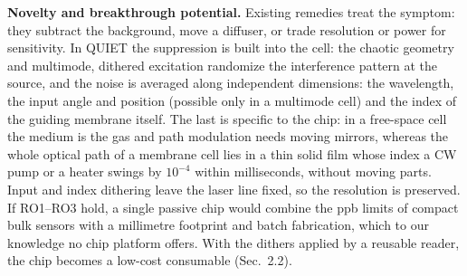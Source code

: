 \documentclass[a4paper,12pt]{article}
\newcommand{\hc}[1]{\textcolor{dkplum}{#1}} %
\begin{document}

\textbf{Novelty and breakthrough potential.} Existing remedies treat the symptom: they subtract the background, move a diffuser, or trade resolution or power for sensitivity. In QUIET the suppression is built into the cell: the chaotic geometry and multimode, dithered excitation randomize the interference pattern at the source, \hc{and the noise is averaged along independent dimensions: the wavelength, the input angle and position (possible only in a multimode cell) and the index of the guiding membrane itself. The last is specific to the chip: in a free-space cell the medium is the gas and path modulation needs moving mirrors, whereas the whole optical path of a membrane cell lies in a thin solid film whose index a CW pump or a heater swings by $10^{-4}$ within milliseconds, without moving parts. Input and index dithering leave the laser line fixed, so the resolution is preserved.} If RO1--RO3 hold, a single passive chip would combine the ppb limits of compact bulk sensors \cite{Dong2016} with a millimetre footprint and batch fabrication, which to our knowledge no chip platform offers. With the dithers applied by a reusable reader, the chip becomes a low-cost consumable (Sec.~2.2).


\end{document}
